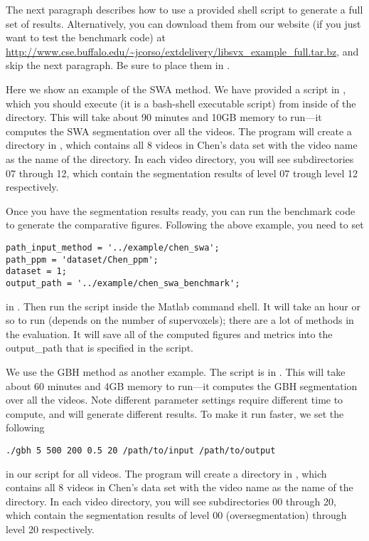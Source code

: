 \documentclass{article}
\begin{document}
The next paragraph describes how to use a provided shell script to generate a full set of results. Alternatively, you can download them from our website (if you just want to test the benchmark code) at \url{http://www.cse.buffalo.edu/~jcorso/extdelivery/libsvx_example_full.tar.bz}, and skip the next paragraph. Be sure to place them in .

Here we show an example of the SWA method. We have provided a script in , which you should execute (it is a bash-shell executable script) from inside of the  directory. This will take about 90 minutes and 10GB memory to run---it computes the SWA segmentation over all the videos.  The program will create a directory in , which contains all 8 videos in Chen's data set with the video name as the name of the directory. In each video directory, you will see subdirectories 07 through 12, which contain the segmentation results of level 07 trough level 12 respectively.

Once you have the segmentation results ready, you can run the benchmark code to generate the comparative figures. Following the above example, you need to set 
\begin{verbatim}
path_input_method = '../example/chen_swa';
path_ppm = 'dataset/Chen_ppm';
dataset = 1;
output_path = '../example/chen_swa_benchmark';
\end{verbatim}
in . Then run the script inside the Matlab command shell.  It will take an hour or so to run (depends on the number of supervoxels); there are a lot of methods in the evaluation. It will save all of the computed figures and metrics into the output\_path that is specified in the script.

We use the GBH method as another example. The script is in . This will take about 60 minutes and 4GB memory to run---it computes the GBH segmentation over all the videos. Note different parameter settings require different time to compute, and will generate different results. To make it run faster, we set the following
\begin{verbatim}
./gbh 5 500 200 0.5 20 /path/to/input /path/to/output
\end{verbatim}
in our script for all videos. The program will create a directory in , which contains all 8 videos in Chen's data set with the video name as the name of the directory. In each video directory, you will see subdirectories 00 through 20, which contain the segmentation results of level 00 (oversegmentation) through level 20 respectively.
\end{document}
